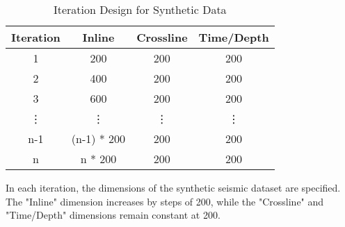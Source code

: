 \begin{table}[htbp]
    \centering
    \begin{threeparttable}
        \caption{Iteration Design for Synthetic Data}
        \label{table:iteration-design}
        \begin{tabular}{|c|c|c|c|}
            \hline
            \textbf{Iteration} & \textbf{Inline} & \textbf{Crossline} & \textbf{Time/Depth} \\
            \hline
            1                  & 200             & 200                & 200                 \\
            \hline
            2                  & 400             & 200                & 200                 \\
            \hline
            3                  & 600             & 200                & 200                 \\
            \hline
            \vdots             & \vdots          & \vdots             & \vdots              \\
            \hline
            n-1                & (n-1) * 200     & 200                & 200                 \\
            \hline
            n                  & n * 200         & 200                & 200                 \\
            \hline
        \end{tabular}
        \begin{tablenotes}
            \small
            \item In each iteration, the dimensions of the synthetic seismic dataset are specified.
            The "Inline" dimension increases by steps of 200, while the "Crossline" and "Time/Depth" dimensions remain constant at 200.
        \end{tablenotes}
    \end{threeparttable}
\end{table}


